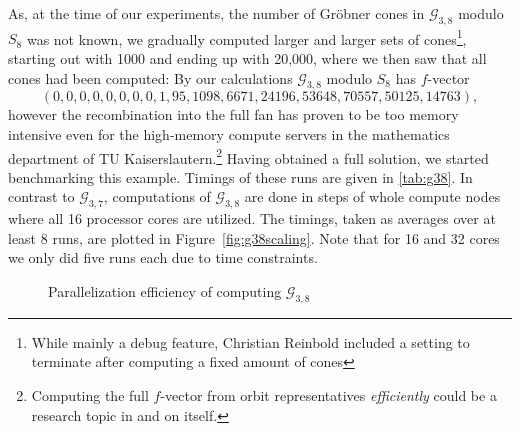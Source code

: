 \documentclass[
  paper=a4,
  titlepage,
  bibliography=totoc,
  pagesize=pdftex
]{scrartcl}
\numberwithin{figure}{section}
\numberwithin{equation}{section}
\numberwithin{table}{section}
\theoremstyle{definition}
\numberwithin{definition}{section}
\begin{document}
As, at the time of our experiments, the number of Gröbner cones in $\mathcal G_{3,8}$
modulo $S_8$ was not known, we gradually computed larger and larger sets of
cones\footnote{While mainly a debug feature, Christian Reinbold included a setting to
terminate after computing a fixed amount of cones}, starting out with 1000 and ending up
with {20,000}, where we then saw that all cones had been computed: By our calculations
$\mathcal G_{3,8}$ modulo $S_8$ has $f$-vector
\[
  (0,0,0,0,0,0,0,0,1,95,1098,6671,24196,53648,70557,50125,14763),
\]
however the recombination into the full fan has proven to be too memory intensive even for
the high-memory compute servers in the mathematics department of TU
Kaiserslautern.\footnote{Computing the full $f$-vector from orbit representatives
\emph{efficiently} could be a research topic in and on itself.} Having obtained a full
solution, we started benchmarking this example. Timings of these runs are given in
\ref{tab:g38}. In contrast to $\mathcal G_{3,7}$, computations of $\mathcal G_{3,8}$ are
done in steps of whole compute nodes where all 16 processor cores are utilized. The
timings, taken as averages over at least 8 runs, are plotted in
Figure~\ref{fig:g38scaling}. Note that for 16 and 32 cores we only did five runs each due
to time constraints.

\begin{figure}[htb]
  \begin{center}
    
  \end{center}
  \caption{Parallelization efficiency of computing $\mathcal{G}_{3,8}$}
  \label{fig:g38efficiency}
\end{figure}
\end{document}
